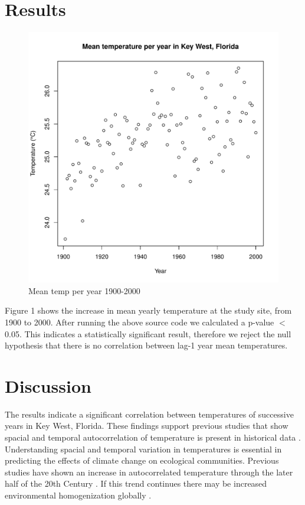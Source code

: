 \documentclass[12pt]{article}
\begin{document}
\section{Results}
\begin{figure}[h!] 
	\includegraphics[width=\linewidth]{TAutoPlot1.pdf}
	\caption{Mean temp per year 1900-2000} 
\end{figure}

Figure 1 shows the increase in mean yearly temperature at the study site, from 1900 to 2000. After running the above source code we calculated a p-value $<$ 0.05. This indicates a statistically significant result, therefore we reject the null hypothesis that there is no correlation between lag-1 year mean temperatures. 

\section{Discussion}
The results indicate a significant correlation between temperatures of successive years in Key West, Florida. These findings support previous studies that show spacial and temporal autocorrelation of temperature is present in historical data  \cite{di2018increased}\cite{koenig2016temporally}. Understanding spacial and temporal variation in temperatures is essential in predicting the effects of climate change on ecological communities. Previous studies have shown an increase in autocorrelated temperature through the later half of the 20th Century \cite{dillon2016life}. If this trend continues there may be increased environmental homogenization globally \cite{wu2012enhanced}.
\end{document}
